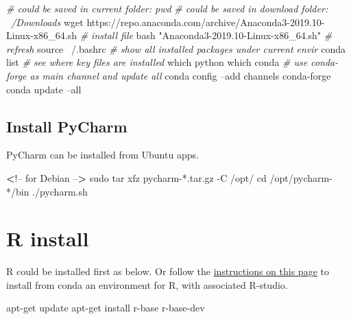 \documentclass[
]{article}
\newenvironment{Shaded}{\begin{snugshade}}{\end{snugshade}}
\newcommand{\BuiltInTok}[1]{#1}
\newcommand{\CommentTok}[1]{\textcolor[rgb]{0.56,0.35,0.01}{\textit{#1}}}
\newcommand{\ExtensionTok}[1]{#1}
\newcommand{\FunctionTok}[1]{\textcolor[rgb]{0.00,0.00,0.00}{#1}}
\newcommand{\NormalTok}[1]{#1}
\newcommand{\OperatorTok}[1]{\textcolor[rgb]{0.81,0.36,0.00}{\textbf{#1}}}
\newcommand{\StringTok}[1]{\textcolor[rgb]{0.31,0.60,0.02}{#1}}
\begin{document}
\begin{Shaded}
\begin{Highlighting}[]
\CommentTok{# could be saved in current folder: pwd}
\CommentTok{# could be saved in download folder: ~/Downloads}
\FunctionTok{wget}\NormalTok{ https://repo.anaconda.com/archive/Anaconda3-2019.10-Linux-x86_64.sh}
\CommentTok{# install file}
\FunctionTok{bash} \StringTok{"Anaconda3-2019.10-Linux-x86_64.sh"}
\CommentTok{# refresh}
\BuiltInTok{source}\NormalTok{ ~/.bashrc}
\CommentTok{# show all installed packages under current envir}
\ExtensionTok{conda}\NormalTok{ list}
\CommentTok{# see where key files are installed}
\FunctionTok{which}\NormalTok{ python}
\FunctionTok{which}\NormalTok{ conda}
\CommentTok{# use conda-forge as main channel and update all}
\ExtensionTok{conda}\NormalTok{ config --add channels conda-forge}
\ExtensionTok{conda}\NormalTok{ update --all}
\end{Highlighting}
\end{Shaded}

\hypertarget{install-pycharm}{%
\subsection{Install PyCharm}\label{install-pycharm}}

PyCharm can be installed from Ubuntu apps.

\begin{Shaded}
\begin{Highlighting}[]
\OperatorTok{<}\NormalTok{!}\ExtensionTok{--}\NormalTok{ for Debian --}\OperatorTok{>}
\FunctionTok{sudo}\NormalTok{ tar xfz pycharm-*.tar.gz -C /opt/}
\BuiltInTok{cd}\NormalTok{ /opt/pycharm-*/bin}
\ExtensionTok{./pycharm.sh}
\end{Highlighting}
\end{Shaded}

\hypertarget{r-install}{%
\section{R install}\label{r-install}}

R could be installed first as below. Or follow the
\href{https://fanwangecon.github.io/Tex4Econ/nontex/install/windows/fn_installations.html}{instructions
on this page} to install from conda an environment for R, with
associated R-studio.

\begin{Shaded}
\begin{Highlighting}[]
\ExtensionTok{apt-get}\NormalTok{ update}
\ExtensionTok{apt-get}\NormalTok{ install r-base r-base-dev}
\end{Highlighting}
\end{Shaded}
\end{document}
